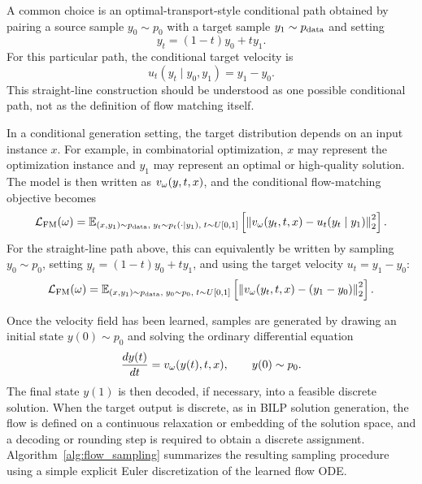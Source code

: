 A common choice is an optimal-transport-style conditional path obtained by pairing a source sample $y_0\sim p_0$ with a target sample $y_1\sim p_{\mathrm{data}}$ and setting
\begin{equation}
    y_t = (1-t)y_0 + t y_1.
\end{equation}
For this particular path, the conditional target velocity is
\begin{equation}
    u_t(y_t \mid y_0,y_1) = y_1-y_0.
\end{equation}
This straight-line construction should be understood as one possible conditional path, not as the definition of flow matching itself.

In a conditional generation setting, the target distribution depends on an input instance $x$. For example, in combinatorial optimization, $x$ may represent the optimization instance and $y_1$ may represent an optimal or high-quality solution. The model is then written as $v_{\omega}(y,t,x)$, and the conditional flow-matching objective becomes
\begin{equation}
    \mathcal{L}_{\mathrm{FM}}(\omega)
    =
    \mathbb{E}_{(x,y_1)\sim p_{\mathrm{data}},\; y_t\sim p_t(\cdot\mid y_1),\; t\sim U[0,1]}
    \left[
        \left\|
            v_{\omega}(y_t,t,x) - u_t(y_t\mid y_1)
        \right\|_2^2
    \right].
\end{equation}
For the straight-line path above, this can equivalently be written by sampling $y_0\sim p_0$, setting $y_t=(1-t)y_0+ty_1$, and using the target velocity $u_t=y_1-y_0$:
\begin{equation}
    \mathcal{L}_{\mathrm{FM}}(\omega)
    =
    \mathbb{E}_{(x,y_1)\sim p_{\mathrm{data}},\; y_0\sim p_0,\; t\sim U[0,1]}
    \left[
        \left\|
            v_{\omega}(y_t,t,x) - (y_1-y_0)
        \right\|_2^2
    \right].
\end{equation}

Once the velocity field has been learned, samples are generated by drawing an initial state $y(0)\sim p_0$ and solving the ordinary differential equation
\begin{equation}
    \frac{d y(t)}{dt}
    =
    v_{\omega}(y(t),t,x),
    \qquad
    y(0)\sim p_0.
\end{equation}
The final state $y(1)$ is then decoded, if necessary, into a feasible discrete solution. When the target output is discrete, as in BILP solution generation, the flow is defined on a continuous relaxation or embedding of the solution space, and a decoding or rounding step is required to obtain a discrete assignment. Algorithm~\ref{alg:flow_sampling} summarizes the resulting sampling procedure using a simple explicit Euler discretization of the learned flow ODE.

